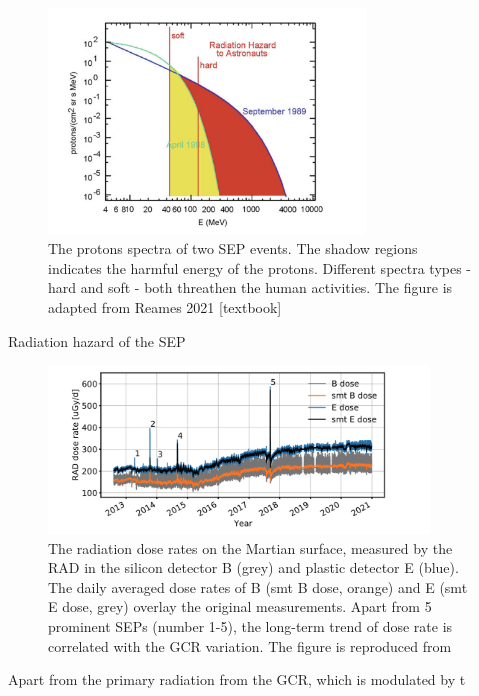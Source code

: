 \begin{figure}
	\centering
	\includegraphics[width = 0.75\textwidth]{images/SEP-radiation_hazard.png}
	\caption{The protons spectra of two SEP events. The shadow regions indicates the harmful energy of the protons. Different spectra types - hard and soft - both threathen the human activities. The figure is adapted from Reames 2021 [textbook]}
	\label{Fig:SEP-radiation_hazard}
\end{figure}
Radiation hazard of the SEP 


\begin{figure}
	\centering
	\includegraphics[width = 0.9\textwidth]{images/Rad_GCR_radiation.png}

	\caption{The radiation dose rates on the Martian surface, measured by the \ac{RAD} in the silicon detector B (grey) and plastic detector E (blue). The daily averaged dose rates of B (smt B dose, orange) and E (smt E dose, grey) overlay the original measurements. Apart from 5 prominent SEPs (number 1-5), the long-term trend of dose rate is correlated with the \ac{GCR} variation. The figure is reproduced from \citep{Guo2021AARv_rad}}
	\label{Fig:Rad_GCR_radiation}
\end{figure}
	
Apart from the primary radiation from the GCR, which is modulated by t

